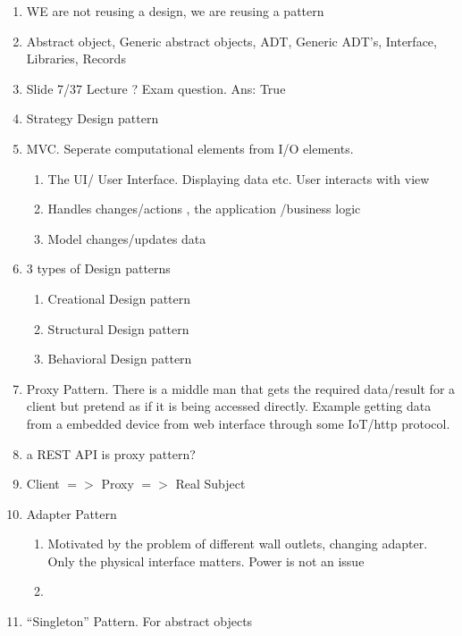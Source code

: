 \documentclass[12pt]{article}
\begin{document}
\begin{enumerate}
\item WE are not reusing a design, we are reusing a pattern
\item Abstract object, Generic abstract objects, ADT, Generic ADT's, Interface, Libraries, Records
\item Slide 7/37 Lecture ? Exam question. Ans: True
\item Strategy Design pattern
\item MVC. Seperate computational elements from I/O elements.

\begin{enumerate}
\item The UI/ User Interface. Displaying data etc. User interacts with view
\item Handles changes/actions , the application /business logic
\item Model changes/updates data
\end{enumerate}

\item 3 types of Design patterns

\begin{enumerate}
\item Creational Design pattern
\item Structural Design pattern
\item Behavioral Design pattern
\end{enumerate}

\item Proxy Pattern. There is a middle man that gets the required data/result for a client but pretend as if it is being accessed directly. Example getting data from a embedded device from web interface through some IoT/http protocol.
\item  a REST API is proxy pattern?

\item Client $=>$ Proxy $=>$ Real Subject

\item Adapter Pattern

\begin{enumerate}
\item Motivated by the problem of different wall outlets, changing adapter. Only the physical interface matters. Power is not an issue
\item 
\end{enumerate}

\item ``Singleton'' Pattern. For abstract objects

\end{enumerate}
\end{document}
